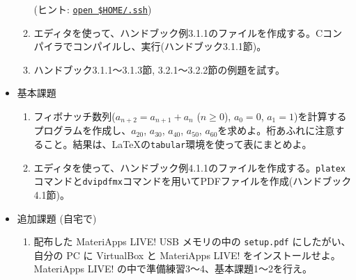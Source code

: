 \documentclass[11pt]{jarticle}
\begin{document}
\begin{itemize}
\begin{enumerate}
    (ヒント: {\tt\underline{open \$HOME/.ssh}})
  \item エディタを使って、ハンドブック例3.1.1のファイルを作成する。Cコンパイラでコンパイルし、実行(ハンドブック3.1.1節)。
  \item ハンドブック3.1.1〜3.1.3節, 3.2.1〜3.2.2節の例題を試す。
  \end{enumerate}
\item 基本課題
  \begin{enumerate}
  \item フィボナッチ数列($a_{n+2}=a_{n+1}+a_n$ ($n \ge 0$), $a_0=0$, $a_1=1$)を計算するプログラムを作成し、$a_{20}$, $a_{30}$, $a_{40}$, $a_{50}$, $a_{60}$を求めよ。桁あふれに注意すること。結果は、\LaTeX の{\tt tabular}環境を使って表にまとめよ。
  \item エディタを使って、ハンドブック例4.1.1のファイルを作成する。{\tt platex}コマンドと{\tt dvipdfmx}コマンドを用いてPDFファイルを作成(ハンドブック4.1節)。
  \end{enumerate}
\item 追加課題 (自宅で)
  \begin{enumerate}
  \item 配布した MateriApps LIVE! USB メモリの中の {\tt setup.pdf} にしたがい、自分の PC に VirtualBox と MateriApps LIVE! をインストールせよ。MateriApps LIVE! の中で準備練習3〜4、基本課題1〜2を行え。
  \end{enumerate}
\end{itemize}
\end{document}
